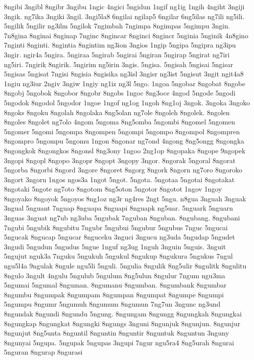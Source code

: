 {8ngibi 3ngibl 8ngibr 3ngibu 1ngic 4ngici 5ngidun 1ngif ng1ig 1ngih 4ngiht
3ngiji 3ngik. ng7ika 3ngiki 3ngil. 3ngi5la8 6ngilai ngilap5 6ngilar
6ng5ilas ng7ili ng5ili. 5ngilik 5ngilir ng3ilm 5ngilok 7ngimbah 7ngimpa
8ngimpas 5ngimpu 3ngin. 7n8gina 8nginai 8nginap 7nginc 8ngincar 8nginci
8ngincr 5nginia 5nginik 4n8gino 7nginti 8nginti. 8ngintia 8ngintim ng3ion
3ngios 1ngip 5ngipa 5ngipra ng3ipu 3ngir. ngir4a 5ngira. 5ngiraa 5ngirab
5ngirai 5ngiran 5ngirap 5ngirat ng7iri ng5iri. 7ngirik 8ngirik. 5ngirim
ng5irin 3ngis. 5ngisa. 5ngisah 5ngisai 5ngisar 5ngisas 5ngisat 7ngisi
8ngisia 8ngisika ng3isl 3ngisr ng3ist 5ngisut 3ngit ngit4a8 1ngiu ng3iur
2ngiv 3ngiw 1ngiy ng1iz ng3l 5ngo. 1ngoa 5ngobar 8ngobat 8ngobe 8ngobj
5ngobok 8ngobor 8ngobr 8ngobs 1ngoc 8ng3oce 4ngod 5ngode 5ngodi 5ngodok
8ngodol 5ngodor 1ngoe 1ngof ng1og 1ngoh 8ng1oj 3ngok. 3ngoka 3ngoko 8ngoks
8ngoku 8ngolah 8ngolaka 8ng5olan ng7ole 8ngoleh 8ngolek. 8ngolen 8ngoles
8ngolet ng7olo 4ngom 5ngoma 8ng5omba 5ngombi 8ngomel 5ngomen 5ngomer
5ngomi 5ngompa 8ngompen 5ngompi 5ngompo 8ngompol 8ngompren 8ngompro
5ngompu 5ngomu 1ngon 8ngonar ng7ond 4ngong 8ng5ongg 8ngongka 8ngongkok
8ngongkos 8ngonsl 8ng3ony 1ngoo 2ng1op 8ngopaka 8ngope 9ngopek 3ngopi
8ngopl 8ngopo 3ngopr 8ngopt 3ngopy 3ngor. 8ngorak 5ngoral 8ngorat 5ngorba
8ngorbi 8ngord 3ngore 8ngoret 8ngorg 8ngork 8ngorn ng7oro 8ngoroko 3ngort
3ngoru 1ngos ngos3a 1ngot 5ngot. 5ngota. 5ngotaa 5ngotai 8ngotakat
8ngotaki 5ngote ng7oto 8ngotom 8ng5oton 5ngotor 8ngotot 1ngov 1ngoy
8ngoyako 8ngoyok 5ngoyos 8ng1oz ng3r ng4res 2ngt 5ngu. n8gua 3nguah 3nguak
3ngual 5nguant 7nguap 8nguapa 8nguapi 8nguapk ng5uar. 5nguark 5nguarn
3nguas 3nguat ng7ub ng3uba 5ngubak 7nguban 8nguban. 8ngubang. 8ngubani
7ngubi 5ngubik 8ngubitu 7ngubr 5ngubui 5ngubur 5ngubus 7nguc 5ngucai
5ngucak 8ngucap 5ngucar 8nguceku 3nguci 3ngucu ng3uda 5ngudap 5ngudet
3ngudi 5ngudun 5ngudus 5ngue 1nguf ng3ug 1nguh 3nguin 5nguis. 3nguit
5ngujut nguk3a 7nguku 5ngukuh 5ngukul 8ngukup 8ngukura 5ngukus 7ngul
ngu5l4a 9ngulak 8ngule ngu5li 5nguli. 5ngulia 8ngulik 8ng5ulir 8ngulitk
8ngulitu 8ngulo 3ngult 4ngulu 5ngulub 5ngulum 8ng5ulun 8ngulur 7ngum
ngu3ma 5ngumai 5ngumal 8nguman. 8ngumanu 8ngumban. 8ngumbank 8ngumbar
8ngumbu 8ngumpak 8ngumpam 8ngumpan 8ngumpat 8ngumpe 8ngumpi 5ngumpu 8ngumr
5ngumuh 8ngumum 8ngumun 7ng7un 3ngunc ng3und 8ngundak 8ngundi 8ngundu
5ngung. 8ngungam 8ngungg 8ngungkah 8ngungkai 8ngungkap 8ngungkat 8ngungki
8ngungs 3nguni 8ngunjuk 8ngunjun. 8ngunjur 8ngunjut 8ng5unta 8nguntil
8nguntin 8nguntir 8nguntuk 8nguntun 3nguny 8ngunyai 5ngupa. 5ngupak
5ngupas 3ngupi 7ngur ngu5ra4 8ng5urah 8ngurai 5nguran 8ngurap 8ngurasi
}
